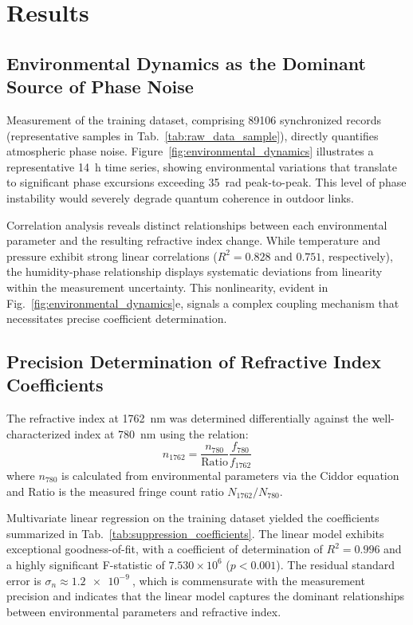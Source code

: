\documentclass[aps,pra,reprint,groupedaddress,twocolumn,superscriptaddress]{revtex4-2}
\begin{document}
\section{Results}
\label{sec:results}

\subsection{Environmental Dynamics as the Dominant Source of Phase Noise}
\label{sec:environmental_dynamics}

Measurement of the training dataset, comprising \num{89106} synchronized records (representative samples in Tab.~\ref{tab:raw_data_sample}), directly quantifies atmospheric phase noise. Figure~\ref{fig:environmental_dynamics} illustrates a representative \SI{14}{\hour} time series, showing environmental variations that translate to significant phase excursions exceeding \SI{35}{\radian} peak-to-peak. This level of phase instability would severely degrade quantum coherence in outdoor links.

Correlation analysis reveals distinct relationships between each environmental parameter and the resulting refractive index change. While temperature and pressure exhibit strong linear correlations ($R^{2} = 0.828$ and $0.751$, respectively), the humidity-phase relationship displays systematic deviations from linearity within the measurement uncertainty. This nonlinearity, evident in Fig.~\ref{fig:environmental_dynamics}e, signals a complex coupling mechanism that necessitates precise coefficient determination.

\subsection{Precision Determination of Refractive Index Coefficients}
\label{sec:coefficient_determination}

The refractive index at \SI{1762}{\nano\meter} was determined differentially against the well-characterized index at \SI{780}{\nano\meter} using the relation:
\begin{equation}
\label{eq:n1762}
    n_{1762} = \frac{n_{780}}{\text{Ratio}} \frac{f_{780}}{f_{1762}}
\end{equation}
where $n_{780}$ is calculated from environmental parameters via the Ciddor equation and Ratio is the measured fringe count ratio $N_{1762}/N_{780}$.

Multivariate linear regression on the training dataset yielded the coefficients summarized in Tab.~\ref{tab:suppression_coefficients}. The linear model exhibits exceptional goodness-of-fit, with a coefficient of determination of $R^2 = 0.996$ and a highly significant F-statistic of $7.530 \times 10^6$ ($p < 0.001$). The residual standard error is $\sigma_n \approx \SI{1.2e-9}{}$, which is commensurate with the measurement precision and indicates that the linear model captures the dominant relationships between environmental parameters and refractive index.
\end{document}
